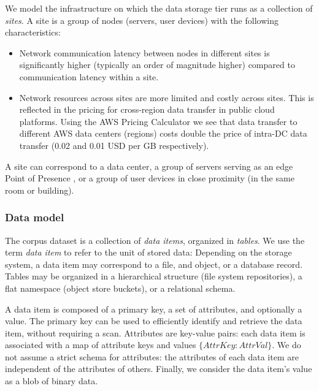 We model the infrastructure on which the data storage tier runs as a collection of \textit{sites}.
A site is a group of nodes (servers, user devices) with the following characteristics:
\begin{itemize}
  \item Network communication latency between nodes in different sites is significantly higher (typically an order of
  magnitude higher) \cite{pbailis:hats} compared to communication latency within a site.
  \item Network resources across sites are more limited and costly across sites.
  This is reflected in the pricing for cross-region data transfer in public cloud platforms.
  Using the AWS Pricing Calculator \cite{aws:costcalc} we see that data transfer to different AWS data centers
  (regions) costs double the price of intra-DC data transfer (0.02 and 0.01 USD per GB respectively).
\end{itemize}

A site can correspond to a data center, a group of servers serving as an edge Point of Presence \cite{google:infra}, or
a group of user devices in close proximity (in the same room or building).


\subsubsection{Data model}
The corpus dataset is a collection of \textit{data items}, organized in \textit{tables}.
We use the term \textit{data item} to refer to the unit of stored data:
Depending on the storage system, a data item may correspond to a file, and object, or a database record.
Tables may be organized in a hierarchical structure (file system repositories), a flat namespace (object store buckets),
or a relational schema.

A data item is composed of a primary key, a set of attributes, and optionally a value.
The primary key can be used to efficiently identify and retrieve the data item, without requiring a scan.
Attributes are key-value pairs: each data item is associated with a map of attribute keys and values
$\{AttrKey: AttrVal\}$.
We do not assume a strict schema for attributes: the attributes of each data item are independent of the attributes of
others.
Finally, we consider the data item's value as a blob of binary data.

